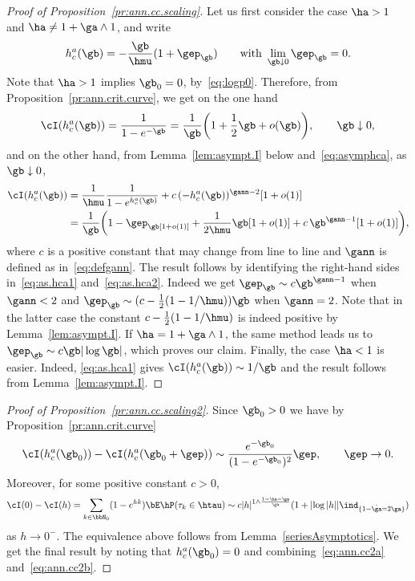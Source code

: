 \begin{proof}[Proof of Proposition~\ref{pr:ann.cc.scaling}]
Let us first consider the case $\ha > 1$ and $\ha \neq 1 + \ga \wedge 1$, and write
\begin{equation}\label{eq:asymphca}
h_c^a(\gb) = - \frac{\gb}{\hmu} (1 + \gep_\gb) \qquad \text{with } \lim_{\gb\downarrow0} \gep_\gb = 0.
\end{equation}
Note that $\ha > 1$ implies $\gb_0 = 0$, by~\eqref{eq:logp0}. Therefore, from Proposition~\ref{pr:ann.crit.curve}, we get on the one hand
\begin{equation}\label{eq:as.hca1}
\cI(h_c^a(\gb)) = \frac{1}{1 - e^{- \gb}} = \frac{1}{\gb} \bigg(1 + \frac{1}{2} \gb + o(\gb) \bigg), \qquad \gb \downarrow 0,
\end{equation}
and on the other hand, from Lemma~\ref{lem:asympt.I} below and~\eqref{eq:asymphca}, as $\gb \downarrow 0$,
\begin{equation}\label{eq:as.hca2}
\begin{aligned}
\cI(h_c^a(\gb)) &= \frac{1}{\hmu} \frac{1}{1 - e^{h_c^a(\gb)}} + c \, (- h_c^a(\gb))^{\gann - 2} [1 + o(1)]\\
&= \frac{1}{\gb} \bigg(1 - \gep_\gb [1 + o(1)] + \frac{1}{2 \hmu} \gb [1 + o(1)] + c \, \gb^{\gann - 1} [1 + o(1)] \bigg),
\end{aligned}
\end{equation}
where $c$ is a positive constant that may change from line to line and $\gann$ is defined as in~\eqref{eq:defgann}. The result follows by identifying the right-hand sides in~\eqref{eq:as.hca1} and~\eqref{eq:as.hca2}. Indeed we get $\gep_\gb \sim c \gb^{\gann - 1}$ when $\gann<2$ and $\gep_\gb \sim (c-\tfrac12 (1-1/\hmu)) \gb$ when $\gann =2$. Note that in the latter case the constant $c-\tfrac12 (1-1/\hmu)$ is indeed positive by Lemma~\ref{lem:asympt.I}. If $\ha = 1 + \ga \wedge 1$, the same method leads us to $\gep_\gb \sim c \gb |\log \gb|$, which proves our claim. Finally, the case $\ha < 1$ is easier. Indeed, \eqref{eq:as.hca1} gives $\cI(h_c^a(\gb)) \sim 1/\gb$ and the result follows from Lemma~\ref{lem:asympt.I}.
\end{proof}

\begin{proof}[Proof of Proposition~\ref{pr:ann.cc.scaling2}]
Since $\gb_0 > 0$ we have by Proposition~\ref{pr:ann.crit.curve}
\begin{equation}\label{eq:ann.cc2a}
\cI(h_c^a(\gb_0)) - \cI(h_c^a(\gb_0 + \gep)) \sim \frac{e^{-\gb_0}}{(1-e^{-\gb_0})^2} \gep, \qquad \gep\to0.
\end{equation} Moreover, for some positive constant $c>0$,
\begin{equation}\label{eq:ann.cc2b}
\cI(0) - \cI(h) = \sum_{k\in\bbN_0} (1- e^{h k}) \bE \hP(\tau_k \in \htau) \sim c |h|^{1\wedge \frac{1-\ha-\ga}{\ga}}(1+|{\log |h|}|\ind_{\{1-\hat \ga=2\ga\}})
\end{equation}
as $h\to 0^-$. The equivalence above follows from Lemma~\ref{seriesAsymptotics}. We get the final result by noting that $h_c^a(\gb_0)=0$ and combining~\eqref{eq:ann.cc2a} and~\eqref{eq:ann.cc2b}.
\end{proof}


